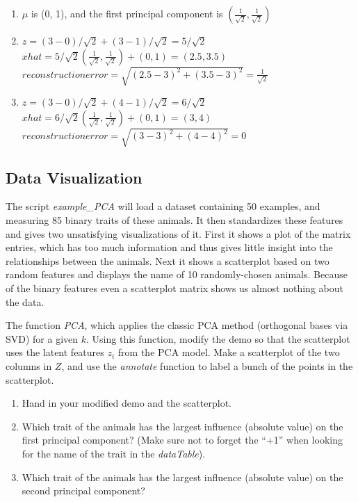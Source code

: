 \documentclass{article}
\def\blu#1{{\color{blu}#1}}
\def\enum#1{\begin{enumerate}#1\end{enumerate}}
\begin{document}
\enum{
\item $\mu$ is (0, 1), and the first principal component is $(\frac{1}{\sqrt2},\frac{1}{\sqrt2})$
\item $ z = (3-0)/ \sqrt2 +(3-1)/ \sqrt2 = 5/\sqrt2$ \\
        $ xhat = 5/\sqrt2 (\frac{1}{\sqrt2},\frac{1}{\sqrt2}) +(0,1) = (2.5,3.5)$\\
       $ reconstruction error = \sqrt{ (2.5-3)^2+(3.5-3)^2} = \frac{1}{\sqrt2} $
\item $ z = (3-0)/ \sqrt2 +(4-1)/ \sqrt2 = 6/\sqrt2$ \\
        $ xhat = 6/\sqrt2 (\frac{1}{\sqrt2},\frac{1}{\sqrt2}) +(0,1) = (3,4)$\\
       $ reconstruction error = \sqrt{ (3-3)^2+(4-4)^2} = 0 $
}


\subsection{Data Visualization}

The script \emph{example\_PCA} will load a dataset containing 50 examples, and measuring 85 binary traits of these animals. It then standardizes these features and gives two unsatisfying visualizations of it. First it shows a plot of the matrix entries, which has too much information and thus gives little insight into the relationships between the animals. Next it shows a scatterplot based on two random features and displays the name of 10 randomly-chosen animals. Because of the binary features even a scatterplot matrix shows us almost nothing about the data.

The function \emph{PCA}, which applies the classic PCA method (orthogonal bases via SVD) for a given $k$. Using this function, modify the demo so that the scatterplot uses the latent features $z_i$ from the PCA model. Make a scatterplot of the two columns in $Z$, and use the \emph{annotate} function to label a bunch of the points in the scatterplot.
\blu{
\enum{
\item  Hand in your modified demo and the scatterplot.
\item Which trait of the animals has the largest influence (absolute value) on the first principal component? (Make sure not to forget the ``+1'' when looking for the name of the trait in the \emph{dataTable}).
\item Which trait of the animals has the largest influence (absolute value) on the second principal component?
}
}
\end{document}
